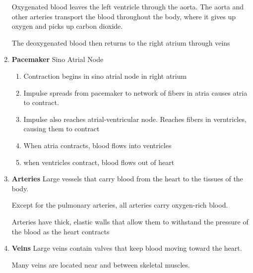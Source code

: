 \documentclass[9pt]{article}
\begin{document}
\begin{enumerate}
  Oxygenated blood leaves the left ventricle through the aorta. The aorta and other arteries transport the blood throughout the body, where it gives up oxygen and picks up carbon dioxide.

  The deoxygenated blood then returns to the right atrium through veins
  \item {\bf Pacemaker} Sino Atrial Node
  \begin{enumerate}
    \item Contraction begins in sino atrial node in right atrium
    \item Impulse spreads from pacemaker to network of fibers in atria causes atria to contract.
    \item Impulse also reaches atrial-ventricular node. Reaches fibers in verntricles, causing them to contract
    \item When atria contracts, blood flows into ventricles
    \item when ventricles contract, blood flows out of heart
  \end{enumerate}
  \item {\bf Arteries} Large vessels that carry blood from the heart to the tissues of the body.

   Except for the pulmonary arteries, all arteries carry oxygen-rich blood.

   Arteries have thick, elastic walls that allow them to withstand the pressure of the blood as the heart contracts
  \item {\bf Veins}  Large veins contain valves that keep blood moving toward the heart.

   Many veins are located near and between skeletal muscles.


\end{enumerate}
\end{document}
